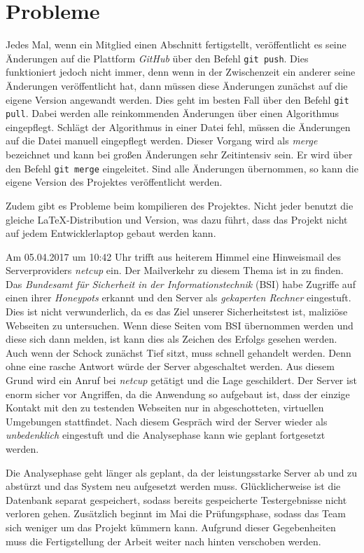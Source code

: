 \documentclass[
	pdftex,
	fontsize=12pt,          %
	DIV10,                  %
	ngerman,                %
	paper=a4,               %
	twoside=false,          %
	titlepage,              %
	parskip=half,           %
	headings=normal,        %
	listof=nochaptergap,  %
	bibliography=totoc, %
	index=totoc,            %
	captions=tableheading,  %
	final                 %
]{scrreprt}
\begin{document}
\section{Probleme}
Jedes Mal, wenn ein Mitglied einen Abschnitt fertigstellt, veröffentlicht es seine Änderungen auf die Plattform \textit{GitHub} über den Befehl \texttt{git push}. Dies funktioniert jedoch nicht immer, denn wenn in der Zwischenzeit ein anderer seine Änderungen veröffentlicht hat, dann müssen diese Änderungen zunächst auf die eigene Version angewandt werden. Dies geht im besten Fall über den Befehl \texttt{git pull}. Dabei werden alle reinkommenden Änderungen über einen Algorithmus eingepflegt. Schlägt der Algorithmus in einer Datei fehl, müssen die Änderungen auf die Datei manuell eingepflegt werden. Dieser Vorgang wird als \textit{merge} bezeichnet und kann bei großen Änderungen sehr Zeitintensiv sein. Er wird über den Befehl \texttt{git merge} eingeleitet. Sind alle Änderungen übernommen, so kann die eigene Version des Projektes veröffentlicht werden.

Zudem gibt es Probleme beim kompilieren des Projektes. Nicht jeder benutzt die gleiche LaTeX-Distribution und Version, was dazu führt, dass das Projekt nicht auf jedem Entwicklerlaptop gebaut werden kann.

Am 05.04.2017 um 10:42 Uhr trifft aus heiterem Himmel eine Hinweismail des Serverproviders \textit{netcup} ein. Der Mailverkehr zu diesem Thema ist in  zu finden. Das \textit{Bundesamt für Sicherheit in der Informationstechnik} (BSI) habe Zugriffe auf einen ihrer \textit{Honeypots} erkannt und den Server als \textit{gekaperten Rechner} eingestuft. Dies ist nicht verwunderlich, da es das Ziel unserer Sicherheitstest ist, maliziöse Webseiten zu untersuchen. Wenn diese Seiten vom BSI übernommen werden und diese sich dann melden, ist kann dies als Zeichen des Erfolgs gesehen werden. Auch wenn der Schock zunächst Tief sitzt, muss schnell gehandelt werden. Denn ohne eine rasche Antwort würde der Server abgeschaltet werden. Aus diesem Grund wird ein Anruf bei \textit{netcup} getätigt und die Lage geschildert. Der Server ist enorm sicher vor Angriffen, da die Anwendung so aufgebaut ist, dass der einzige Kontakt mit den zu testenden Webseiten nur in abgeschotteten, virtuellen Umgebungen stattfindet. Nach diesem Gespräch wird der Server wieder als \textit{unbedenklich} eingestuft und die Analysephase kann wie geplant fortgesetzt werden.

Die Analysephase geht länger als geplant, da der leistungsstarke Server ab und zu abstürzt und das System neu aufgesetzt werden muss. Glücklicherweise ist die Datenbank separat gespeichert, sodass bereits gespeicherte Testergebnisse nicht verloren gehen. Zusätzlich beginnt im Mai die Prüfungsphase, sodass das Team sich weniger um das Projekt kümmern kann. Aufgrund dieser Gegebenheiten muss die Fertigstellung der Arbeit weiter nach hinten verschoben werden.
\end{document}
